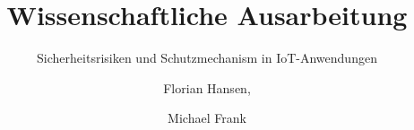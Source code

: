 \documentclass{hsflensburg}
\title{Wissenschaftliche Ausarbeitung}
\subtitle{Sicherheitsrisiken und Schutzmechanism in IoT-Anwendungen}
\author{
	Florian Hansen,
	\and
	Michael Frank
}
\begin{document}
	\maketitle
  \tableofcontents

  \pagebreak
  
  
  
  
  

	\clearpage
	
	
\end{document}
